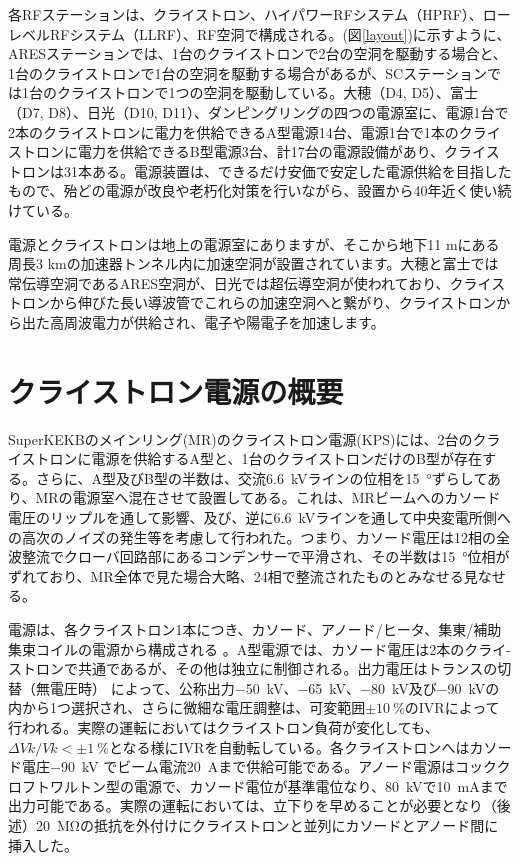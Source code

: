 \documentclass[book,openany]{jlreq}
\theoremstyle{definition}
\begin{document}
各RFステーションは、クライストロン、ハイパワーRFシステム（HPRF）、ローレベルRFシステム（LLRF）、RF空洞で構成される。(図\ref{layout})に示すように、ARESステーションでは、1台のクライストロンで2台の空洞を駆動する場合と、1台のクライストロンで1台の空洞を駆動する場合があるが、SCステーションでは1台のクライストロンで1つの空洞を駆動している。大穂（D4, D5）、富士（D7, D8）、日光（D10, D11）、ダンピングリングの四つの電源室に、電源1台で2本のクライストロンに電力を供給できるA型電源14台、電源1台で1本のクライストロンに電力を供給できるB型電源3台、計17台の電源設備があり、クライストロンは31本ある。電源装置は、できるだけ安価で安定した電源供給を目指したもので、殆どの電源が改良や老朽化対策を行いながら、設置から40年近く使い続けている。

電源とクライストロンは地上の電源室にありますが、そこから地下11 mにある周長3 kmの加速器トンネル内に加速空洞が設置されています。大穂と富士では常伝導空洞であるARES空洞が、日光では超伝導空洞が使われており、クライストロンから伸びた長い導波管でこれらの加速空洞へと繋がり、クライストロンから出た高周波電力が供給され、電子や陽電子を加速します。




\section{クライストロン電源の概要}

SuperKEKBのメインリング(MR)のクライストロン電源(KPS)には、2台のクライストロンに電源を供給するA型と、1台のクライストロンだけのB型が存在する。さらに、A型及びB型の半数は、交流\qty{6.6}{\kilo\volt}ラインの位相を\qty{15}{\degree}ずらしてあり、MRの電源室へ混在させて設置してある。これは、MRビームへのカソード電圧のリップルを通して影響、及び、逆に\qty{6.6}{\kilo\volt}ラインを通して中央変電所側への高次のノイズの発生等を考慮して行われた。つまり、カソード電圧は12相の全波整流でクローバ回路部にあるコンデンサーで平滑され、その半数は\qty{15}{\degree}位相がずれており、MR全体で見た場合大略、24相で整流されたものとみなせる見なせる。

電源は、各クライストロン1本につき、カソード、アノード/ヒータ、集東/補助集束コイルの電源から構成される 。A型電源では、カソード電圧は2本のクライ-ストロンで共通であるが、その他は独立に制御される。出力電圧はトランスの切替（無電圧時） によって、公称出力\qty{-50}{\kilo\volt}、\qty{-65}{\kilo\volt}、\qty{-80}{\kilo\volt}及び\qty{-90}{\kilo\volt}の内から1つ選択され、さらに微細な電圧調整は、可変範囲$\pm \qty{10}{\percent}$のIVRによって行われる。実際の運転においてはクライストロン負荷が変化しても、$\Delta Vk/Vk<\pm \qty{1}{\percent}$となる様にIVRを自動転している。各クライストロンへはカソード電庄\qty{-90}{\kilo\volt} でビーム電流\qty{20}{\ampere}まで供給可能である。アノード電源はコッククロフトワルトン型の電源で、カソード電位が基準電位なり、\qty{+80}{\kilo\volt}で\qty{10}{\milli\ampere}まで出力可能である。実際の運転においては、立下りを早めることが必要となり（後述）\qty{20}{\mega\ohm}の抵抗を外付けにクライストロンと並列にカソードとアノード間に挿入した。
\end{document}
